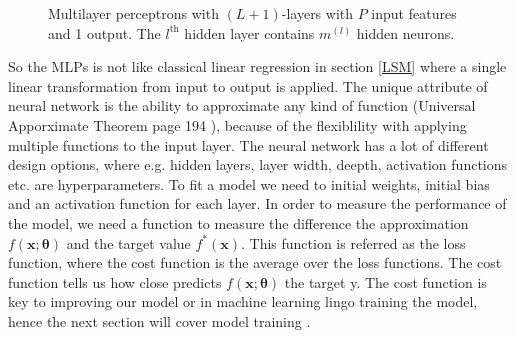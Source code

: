 \begin{figure}[th]
	\caption[Multilayer perceptrons with $(L+1)$-layers]{Multilayer perceptrons with $(L+1)$-layers with $P$ input features and 1 output. The $l^{\text{th}}$ hidden layer contains $m^{(l)}$ hidden neurons.}
	\label{fig:multilayer-perceptron}
\end{figure}

So the MLPs is not like classical linear regression in section \ref{LSM} where a single linear transformation from input to output is applied. The unique attribute of neural network is the ability to approximate any kind of function (Universal Apporximate Theorem page 194 \parencite{Goodfellow-et-al-2016}), because of the flexiblility with applying multiple functions to the input layer. The neural network has a lot of different design options, where e.g. hidden layers, layer width, deepth, activation functions etc. are hyperparameters. To fit a model we need to initial weights, initial bias and an activation function for each layer. In order to measure the performance of the model, we need a function to measure the difference the approximation $f(\bm{x};\bm{\theta})$ and the target value $f^*(\bm{x})$. This function is referred as the loss function, where the cost function is the average over the loss functions. The cost function tells us how close predicts $f(\bm{x};\bm{\theta})$ the target y. The cost function is key to improving our model or in machine learning lingo training the model, hence the next section will cover model training \parencite{Goodfellow-et-al-2016}.

